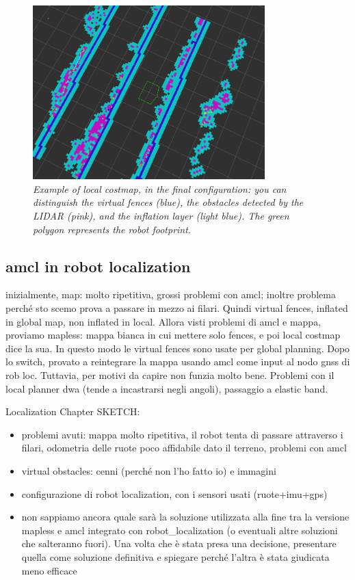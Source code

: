 \begin{figure}
	\centering
	\includegraphics[width=0.8\textwidth]{Images/localization/localCostmap_highlighted.png}
	\caption{\textit{Example of local costmap, in the final configuration: you can distinguish the virtual fences (blue), the obstacles detected by the \ac{LIDAR} (pink), and the inflation layer (light blue). The green polygon represents the robot footprint.}}
	\label{fig:localCostmap}
\end{figure}

\subsection{amcl in robot localization}


inizialmente, map: molto ripetitiva, grossi problemi con amcl;  inoltre problema perché sto scemo prova a passare in mezzo ai filari. Quindi virtual fences, inflated in global map, non inflated in local. Allora visti problemi di amcl e mappa, proviamo mapless: mappa bianca in cui mettere solo fences, e poi local costmap dice la sua. In questo modo le virtual fences sono usate per global planning. 
Dopo lo switch, provato a reintegrare la mappa usando amcl come input al nodo gnss di rob loc. Tuttavia, per motivi da capire non funzia molto bene. Problemi con il local planner dwa (tende a incastrarsi negli angoli), passaggio a elastic band.








Localization Chapter SKETCH:
\begin{itemize}
	\item problemi avuti: mappa molto ripetitiva, il robot tenta di passare attraverso i filari, odometria delle ruote poco affidabile dato il terreno, problemi con amcl
	\item virtual obstacles: cenni (perché non l'ho fatto io) e immagini
	\item configurazione di robot localization, con i sensori usati (ruote+imu+gps)
	\item non sappiamo ancora quale sarà la soluzione utilizzata alla fine tra la versione mapless e amcl integrato con robot\_localization (o eventuali altre soluzioni che salteranno fuori). Una volta che è stata presa una decisione, presentare quella come soluzione definitiva e spiegare perché l'altra è stata giudicata meno efficace
\end{itemize}


